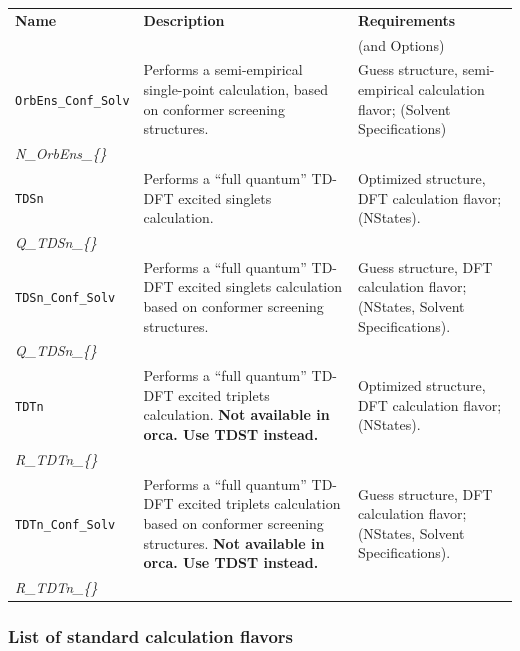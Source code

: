 \documentclass[12pt]{achemso}
\begin{document}
\begin{table}[h!]
    \centering
    \begin{tabular}{p{4cm} | p{8cm} | p{4cm}}
    \hline
    \textbf{Name} &  \textbf{Description}  & \textbf{Requirements}\\
    && (and Options) \\
    \hline
    \hline

    \verb+OrbEns_Conf_Solv+ & Performs a semi-empirical single-point calculation, based on conformer screening structures. & Guess structure, semi-empirical calculation flavor; (Solvent Specifications)\\
    \textit{N\_OrbEns\_\{\}}&&\\
    \hline

    \verb+TDSn+ & Performs a ``full quantum'' TD-DFT excited singlets calculation. & Optimized structure, DFT calculation flavor; (NStates).\\
    \textit{Q\_TDSn\_\{\}}&&\\
    \hline

    \verb+TDSn_Conf_Solv+ & Performs a ``full quantum'' TD-DFT excited singlets calculation based on conformer screening structures. & Guess structure, DFT calculation flavor; (NStates, Solvent Specifications).\\
    \textit{Q\_TDSn\_\{\}}&&\\
    \hline

    \verb+TDTn+ & Performs a ``full quantum'' TD-DFT excited triplets calculation. \textbf{Not available in orca. Use TDST instead.} & Optimized structure, DFT calculation flavor; (NStates).\\
    \textit{R\_TDTn\_\{\}}&&\\
    \hline

    \verb+TDTn_Conf_Solv+ & Performs a ``full quantum'' TD-DFT excited triplets calculation based on conformer screening structures. \textbf{Not available in orca. Use TDST instead.} & Guess structure, DFT calculation flavor; (NStates, Solvent Specifications).\\
    \textit{R\_TDTn\_\{\}}&&\\
    \hline
    
    \end{tabular}
\end{table}

\newpage
\subsubsection{List of standard calculation flavors}
\end{document}
